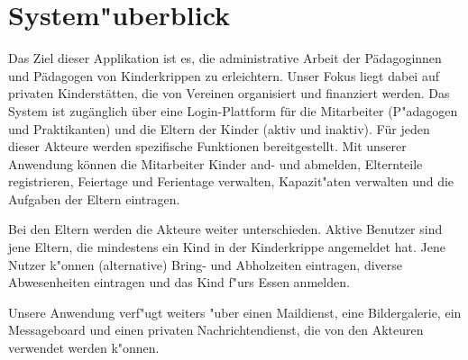 \section{System"uberblick}
  Das Ziel dieser Applikation ist es, die administrative Arbeit der Pädagoginnen und Pädagogen von Kinderkrippen zu erleichtern. Unser Fokus liegt dabei auf privaten Kinderstätten, die von Vereinen organisiert und
  finanziert werden. Das System ist zugänglich über eine Login-Plattform für die Mitarbeiter (P"adagogen und Praktikanten) und die Eltern der Kinder (aktiv und inaktiv). Für jeden dieser Akteure werden spezifische Funktionen bereitgestellt.
  Mit unserer Anwendung können die Mitarbeiter Kinder and- und abmelden, Elternteile registrieren, Feiertage und Ferientage verwalten, Kapazit"aten verwalten und die Aufgaben der Eltern eintragen.
 
  Bei den Eltern werden die Akteure weiter unterschieden. Aktive Benutzer sind jene Eltern, die mindestens ein Kind in der Kinderkrippe angemeldet hat. Jene Nutzer k"onnen (alternative) Bring- und Abholzeiten eintragen, diverse
  Abwesenheiten eintragen und das Kind f"urs Essen anmelden.
  
  Unsere Anwendung verf"ugt weiters "uber einen Maildienst, eine Bildergalerie, ein Messageboard und einen privaten Nachrichtendienst, die von den Akteuren verwendet werden k"onnen.
  